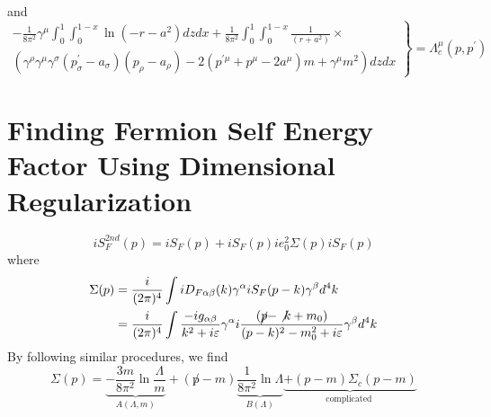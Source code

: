 and
\begin{equation}\left.\begin{array}{c}
-\frac{1}{8 \pi^{2}} \gamma^{\mu} \int_{0}^{1} \int_{0}^{1-x} \ln \left(-r-a^{2}\right) d z d x+\frac{1}{8 \pi^{2}} \int_{0}^{1} \int_{0}^{1-x} \frac{1}{\left(r+a^{2}\right)} \times \\
\left(\gamma^{\rho} \gamma^{\mu} \gamma^{\sigma}\left(p_{\sigma}^{\prime}-a_{\sigma}\right)\left(p_{\rho}-a_{\rho}\right)-2\left(p^{\prime \mu}+p^{\mu}-2 a^{\mu}\right) m+\gamma^{\mu} m^{2}\right) d z d x
\end{array}\right\}=\Lambda_{c}^{\mu}\left(p, p^{\prime}\right)\end{equation}

\section{Finding Fermion Self Energy Factor Using Dimensional Regularization}
\begin{equation}i S_{F}^{2 n d}(p)=i S_{F}(p)+i S_{F}(p) i e_{0}^{2} \Sigma(p) i S_{F}(p)\end{equation}
where
\begin{equation}\begin{aligned}
\Sigma(p) &=\frac{i}{(2 \pi)^{4}} \int i D_{F \alpha \beta}(k) \gamma^{\alpha} i S_{F}(p-k) \gamma^{\beta} d^{4} k \\
&=\frac{i}{(2 \pi)^{4}} \int \frac{-i g_{\alpha \beta}}{k^{2}+i \varepsilon} \gamma^{\alpha} i \frac{\left(\cancel{p}-\not k+m_{0}\right)}{(p-k)^{2}-m_{0}^{2}+i \varepsilon} \gamma^{\beta} d^{4} k
\end{aligned}\end{equation}
By following similar procedures, we find
\begin{equation}\Sigma(p)=\underbrace{-\frac{3 m}{8 \pi^{2}} \ln \frac{\Lambda}{m}}_{A(\Lambda, m)}+(\not p-m) \underbrace{\frac{1}{8 \pi^{2}} \ln \Lambda}_{B(\Lambda)}\underbrace{+(p-m) \Sigma_{c}(p-m)}_{\text {complicated }}
\end{equation}
